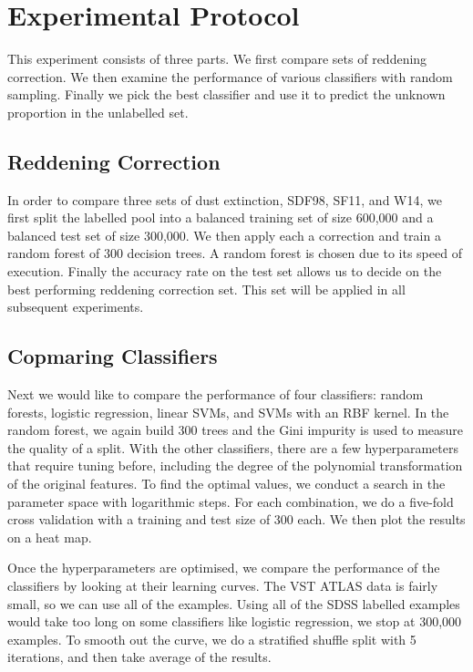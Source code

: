 \section{Experimental Protocol}
\label{sec:protocol1}

This experiment consists of three parts. We first compare sets of reddening correction.
We then examine the performance of various classifiers with random sampling. Finally
we pick the best classifier and use it to predict the unknown proportion in the unlabelled
set.

\subsection{Reddening Correction}
In order to compare three sets of dust extinction, SDF98, SF11, and W14, we first
split the labelled pool into a balanced training set of size 600,000 and a balanced test
set of size 300,000. We then apply each a correction and train a random forest of 300 decision
trees. A random forest is chosen due to its speed of execution. Finally the accuracy rate on the test set allows
us to decide on the best performing reddening correction set. This set will be applied
in all subsequent experiments.

\subsection{Copmaring Classifiers}
Next we would like to compare the performance of four classifiers: random forests, logistic
regression, linear SVMs, and SVMs with an RBF kernel. In the random forest,
we again build 300 trees and the
Gini impurity is used to measure the quality of a split. With the other classifiers,
there
are a few hyperparameters that require tuning before, including the degree of the polynomial
transformation of the original features. To find the optimal values,
we conduct a search in the parameter space with logarithmic steps. For each combination,
we do a five-fold cross validation with a training and test size of 300 each. We then plot
the results on a heat map.

Once the hyperparameters are optimised, we compare the performance of the classifiers by looking
at their learning curves. The VST ATLAS data is fairly small, so we can use all of the examples.
Using all of the SDSS labelled examples would take too long on some classifiers like
logistic regression, we stop at 300,000 examples. To smooth out the curve, we do a
stratified shuffle split with 5 iterations, and then take average of the results.

